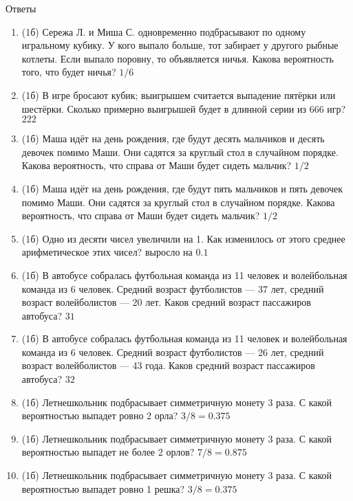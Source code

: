 \documentclass[a4paper, 12pt]{article}
\begin{document}
\newpage
Ответы
\begin{enumerate}
\item (1б) Сережа Л. и Миша С. одновременно подбрасывают по одному игральному кубику. У кого выпало больше, тот забирает у другого рыбные котлеты. 
Если выпало поровну, то объявляется ничья. Какова вероятность того, что будет ничья? $1/6$

\item (1б) В игре бросают кубик; выигрышем считается выпадение пятёрки или шестёрки. Сколько примерно выигрышей будет в длинной серии из 666 игр?
$222$

\item (1б) Маша идёт на день рождения, где будут десять мальчиков и десять девочек помимо Маши. Они садятся за круглый стол в случайном порядке. 
Какова вероятность, что справа от Маши будет сидеть мальчик?
$1/2$

\item (1б) Маша идёт на день рождения, где будут пять мальчиков и пять девочек помимо Маши. Они садятся за круглый стол в случайном порядке. 
Какова вероятность, что справа от Маши будет сидеть мальчик?
$1/2$

\item (1б) Одно из десяти чисел увеличили на 1. Как изменилось от этого среднее арифметическое этих чисел?
выросло на $0.1$

\item (1б) В автобусе собралась футбольная команда из 11 человек и волейбольная команда из 6 человек. Средний возраст футболистов — 37 лет, 
средний возраст волейболистов — 20 лет. Каков средний возраст пассажиров автобуса?
$31$

\item (1б) В автобусе собралась футбольная команда из 11 человек и волейбольная команда из 6 человек. Средний возраст футболистов — 26 лет, 
средний возраст волейболистов — 43 года. Каков средний возраст пассажиров автобуса?
$32$

\item (1б) Летнешкольник подбрасывает симметричную монету 3 раза. С какой вероятностью выпадет ровно 2 орла?
$3/8 = 0.375$

\item (1б) Летнешкольник подбрасывает симметричную монету 3 раза. С какой вероятностью выпадет не более 2 орлов?
$7/8=0.875$

\item (1б) Летнешкольник подбрасывает симметричную монету 3 раза. С какой вероятностью выпадет ровно 1 решка?
$3/8=0.375$


\end{enumerate}
\end{document}
